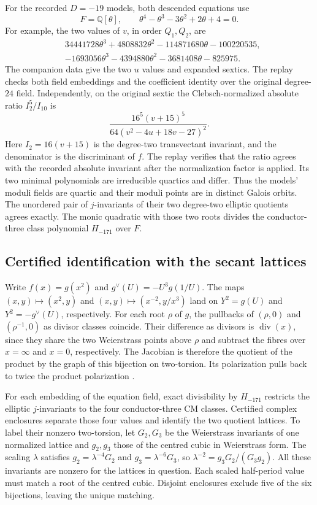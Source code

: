 \documentclass[11pt,letterpaper]{amsart}
\theoremstyle{definition}
\numberwithin{equation}{section}
\newcommand{\Q}{\mathbb Q}
\begin{document}
For the recorded \(D=-19\) models, both descended equations use
\[
 F=\Q[\theta],\qquad \theta^4-\theta^3-3\theta^2+2\theta+4=0 .
\]
For example, the two values of \(v\), in order \(Q_1,Q_2\), are
\[
\begin{aligned}
 &34441728\theta^3+4808832\theta^2-114871680\theta-100220535,\\
 &-1693056\theta^3-4394880\theta^2-3681408\theta-825975 .
\end{aligned}
\]
The companion data give the two \(u\) values and expanded sextics.
The replay checks both field embeddings and the coefficient identity
over the original degree-\(24\) field. Independently, on the original
sextic the Clebsch-normalized absolute ratio \(I_2^5/I_{10}\) is
\[
 \frac{16^5(v+15)^5}{64(v^2-4u+18v-27)^2}.
\]
Here \(I_2=16(v+15)\) is the degree-two transvectant invariant, and
the denominator is the discriminant of \(f\). The replay verifies
that the ratio agrees with the recorded absolute invariant after
the normalization factor is applied. Its two minimal polynomials
are irreducible quartics and differ. Thus the models' moduli fields
are quartic and their moduli points are in distinct Galois orbits.
The unordered pair of \(j\)-invariants of their two degree-two
elliptic quotients agrees exactly. The monic quadratic with those
two roots divides the conductor-three class polynomial
\(H_{-171}\) over \(F\).

\subsection{Certified identification with the secant lattices}

Write \(f(x)=g(x^2)\) and \(g^\vee(U)=-U^3g(1/U)\). The maps
\((x,y)\mapsto(x^2,y)\) and \((x,y)\mapsto(x^{-2},y/x^3)\) land on
\(Y^2=g(U)\) and \(Y^2=-g^\vee(U)\), respectively. For each root
\(\rho\) of \(g\), the pullbacks of \((\rho,0)\) and \((\rho^{-1},0)\)
as divisor classes coincide. Their difference as divisors is
\(\operatorname{div}(x)\), since they share the two Weierstrass
points above \(\rho\) and subtract the fibres over \(x=\infty\)
and \(x=0\), respectively. The Jacobian is therefore the quotient
of the product by the graph of this bijection on two-torsion.
Its polarization pulls back to twice the product polarization
\cite{HLP,KaniII}.

For each embedding of the equation field, exact divisibility by
\(H_{-171}\) restricts the elliptic \(j\)-invariants to the four
conductor-three CM classes. Certified complex enclosures separate
those four values and identify the two quotient lattices. To label
their nonzero two-torsion, let \(G_2,G_3\) be the Weierstrass
invariants of one normalized lattice and \(g_2,g_3\) those of the
centred cubic in Weierstrass form. The scaling \(\lambda\) satisfies
\(g_2=\lambda^{-4}G_2\) and \(g_3=\lambda^{-6}G_3\), so
\(\lambda^{-2}=g_3G_2/(G_3g_2)\). All these invariants are nonzero
for the lattices in question. Each scaled half-period value must
match a root of the centred cubic. Disjoint enclosures exclude five
of the six bijections, leaving the unique matching.
\end{document}
